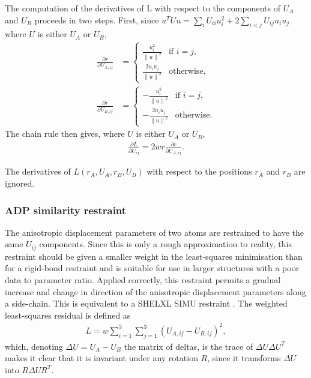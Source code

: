 \documentclass[pdf]{iucr}
\newcommand{\norm}[1]{\left\| #1 \right\|}
\newcommand{\partialder}[2]{\frac{\partial #1}{\partial #2}}
\begin{document}
The computation of the derivatives of L with respect to the components of $U_A$ and $U_B$ proceeds in two steps. First, since $u^T U u = \sum_i U_{ii} u_i^2 + 2\sum_{i<j} U_{ij}u_i u_j$ where $U$ is either $U_A$ or $U_B$, 
\begin{align}
\partialder{r}{U_{A,ij}} &= \begin{cases}
 \displaystyle \frac{u_i^2}{\norm{u}^2} & \text{if $i=j$,}\\[1em]
 \displaystyle \frac{2u_i u_j}{\norm{u}^2} & \text{otherwise,}
 \end{cases}\\
\partialder{r}{U_{B,ij}} &= \begin{cases}
 \displaystyle -\frac{u_i^2}{\norm{u}^2} & \text{if $i=j$,}\\[1em]
 \displaystyle -\frac{2u_i u_j}{\norm{u}^2} & \text{otherwise.}
 \end{cases}
\end{align}
The chain rule then gives, where $U$ is either $U_A$ or $U_B$,
\begin{align}
\partialder{L}{U_{ij}} = 2wr \partialder{r}{U_{A,ij}}.
\end{align}

The derivatives of $L(r_A, U_A, r_B, U_B)$ with respect to the positions $r_A$ and $r_B$ are ignored.

\subsubsection{ADP similarity restraint}
\label{ADP:similarity}
The anisotropic displacement parameters of two atoms are restrained to have the same $U_{ij}$ components. Since this is only a rough approximation to reality, this restraint should be given a smaller weight in the least-squares minimisation than for a rigid-bond restraint and is suitable for use in larger structures with a poor data to parameter ratio. Applied correctly, this restraint permits a gradual increase and change in direction of the anisotropic displacement parameters along a side-chain. This is equivalent to a SHELXL SIMU restraint .
The weighted least-squares residual is defined as
\begin{align}
\label{eqn:ADP:restraints:similarity}
L = w \sum_{i=1}^3 \sum_{j=1}^3 (U_{A,ij} - U_{B,ij})^2,
\end{align}
which, denoting $\Delta U=U_A - U_B$ the matrix of deltas, is the trace of $\Delta U \Delta U^T$ makes it clear that it is invariant under any rotation $R$, since it transforms $\Delta U$ into $R\Delta U R^T$.
\end{document}
